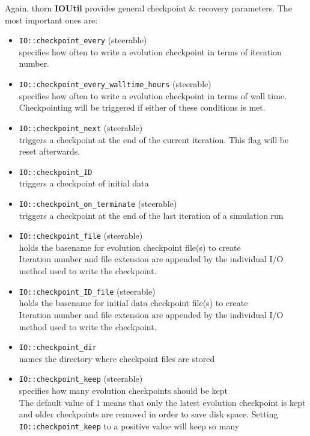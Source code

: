 \documentclass{article}
\begin{document}
Again, thorn {\bf IOUtil} provides general checkpoint \& recovery
parameters. The most important ones are:
\begin{itemize}
  \item {\tt IO::checkpoint\_every} (steerable)\\
    specifies how often to write a evolution checkpoint in terms of iteration
    number.
  \item {\tt IO::checkpoint\_every\_walltime\_hours} (steerable)\\
    specifies how often to write a evolution checkpoint in terms of
    wall time.  Checkpointing will be triggered if either of these
    conditions is met.
  \item {\tt IO::checkpoint\_next} (steerable)\\
    triggers a checkpoint at the end of the current iteration.  This
    flag will be reset afterwards.
  \item {\tt IO::checkpoint\_ID}\\
    triggers a checkpoint of initial data
  \item {\tt IO::checkpoint\_on\_terminate} (steerable)\\
    triggers a checkpoint at the end of the last iteration of a simulation run
  \item {\tt IO::checkpoint\_file} (steerable)\\
    holds the basename for evolution checkpoint file(s) to create\\
    Iteration number and file extension are appended by the individual I/O
    method used to write the checkpoint.
  \item {\tt IO::checkpoint\_ID\_file} (steerable)\\
    holds the basename for initial data checkpoint file(s) to create\\
    Iteration number and file extension are appended by the individual I/O
    method used to write the checkpoint.
  \item {\tt IO::checkpoint\_dir}\\
    names the directory where checkpoint files are stored
  \item {\tt IO::checkpoint\_keep} (steerable)\\
    specifies how many evolution checkpoints should be kept\\
    The default value of $1$ means that only the latest evolution checkpoint
    is kept and older checkpoints are removed in order to save disk space.
    Setting {\tt IO::checkpoint\_keep} to a positive value will keep so many

\end{itemize}
\end{document}
